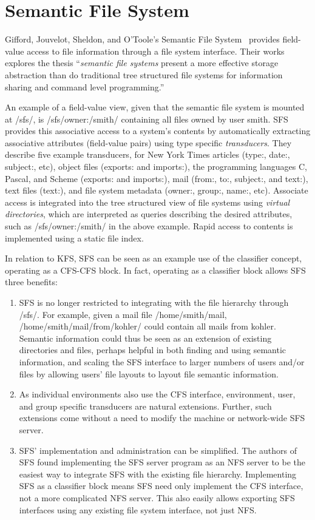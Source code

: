 \section{Semantic File System}
\label{sec:sfs}

Gifford, Jouvelot, Sheldon, and O'Toole's Semantic File
System~\cite{jouvelot91semantic} provides field-value access to file
information through a file system interface. Their works explores the
thesis ``\textit{semantic file systems} present a more effective
storage abstraction than do traditional tree structured file systems
for information sharing and command level programming.''

An example of a field-value view, given that the semantic file system
is mounted at /sfs/, is /sfs/owner:/smith/ containing all files owned
by user smith. SFS provides this associative access to a system's
contents by automatically extracting associative attributes
(field-value pairs) using type specific \textit{transducers}. They
describe five example transducers, for New York Times articles (type:,
date:, subject:, etc), object files (exports: and imports:), the
programming languages C, Pascal, and Scheme (exports: and imports:),
mail (from:, to:, subject:, and text:), text files (text:), and
file system metadata (owner:, group:, name:, etc). Associate access is
integrated into the tree structured view of file systems using
\textit{virtual directories}, which are interpreted as queries
describing the desired attributes, such as /sfs/owner:/smith/ in the
above example. Rapid access to contents is implemented using a static
file index.

In relation to KFS, SFS can be seen as an example use of the classifier
concept, operating as a CFS-CFS block. In fact, operating as a classifier
block allows SFS three benefits:
\begin{enumerate}
\item SFS is no longer restricted to integrating with the file
  hierarchy through /sfs/. For example, given a mail file
  /home/smith/mail, /home/\-smith/\-mail/\-from/\-kohler/ could
  contain all mails from kohler. Semantic information could thus be
  seen as an extension of existing directories and files, perhaps
  helpful in both finding and using semantic information, and scaling
  the SFS interface to larger numbers of users and/or files by
  allowing users' file layouts to layout file semantic information.
\item As individual environments also use the CFS interface,
  environment, user, and group specific transducers are natural
  extensions. Further, such extensions come without a need to modify
  the machine or network-wide SFS server.
\item SFS' implementation and administration can be simplified. The
  authors of SFS found implementing the SFS server program as an NFS
  server to be the easiest way to integrate SFS with the existing file
  hierarchy. Implementing SFS as a classifier block means SFS need
  only implement the CFS interface, not a more complicated NFS server.
  This also easily allows exporting SFS interfaces using any existing
  file system interface, not just NFS.
\end{enumerate}
